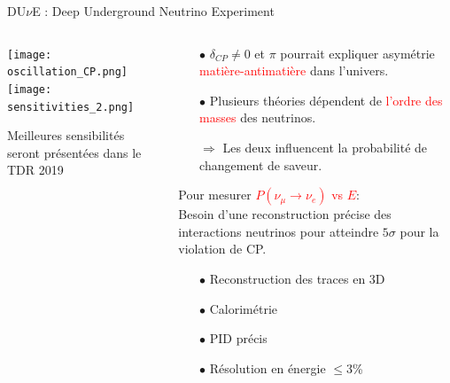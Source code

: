     \begin{frame}{DU$\nu$E : Deep Underground Neutrino Experiment}
        \begin{scriptsize}
            \begin{columns}
                \begin{column}{0.6\textwidth}
                    \centering
                    \texttt{[image: oscillation\_CP.png]}\\\vspace{0.2cm}
                    \texttt{[image: sensitivities\_2.png]}\\
                    \begin{scriptsize}
                        Meilleures sensibilités seront présentées dans le TDR 2019
                    \end{scriptsize}
                \end{column}
                \begin{column}{0.4\textwidth}
                    \begin{itemize}
                        \item[$\bullet$]$\delta_{CP}\ne0$ et $\pi$ pourrait expliquer asymétrie \textcolor{red}{matière-antimatière} dans l'univers.\\
                        \item[$\bullet$] Plusieurs théories dépendent de \textcolor{red}{l'ordre des masses} des neutrinos.
                        \item[$\Rightarrow$] Les deux influencent la probabilité de changement de saveur.
                    \end{itemize}
                    \begin{scriptsize}
                        Pour mesurer \textcolor{red}{$P(\nu_{\mu}\to\nu_e)$ vs $E$}: \\
                        Besoin d'une reconstruction précise des interactions neutrinos pour atteindre $5\sigma$ pour la violation de CP.
                    \end{scriptsize}
                    \begin{itemize}
                        \item[$\bullet$] Reconstruction des traces en 3D
                        \item[$\bullet$] Calorimétrie
                        \item[$\bullet$] PID précis
                        \item[$\bullet$]Résolution en énergie $\leq$3\%
                    \end{itemize}
                \end{column}
            \end{columns}
        \end{scriptsize}
    \end{frame}

